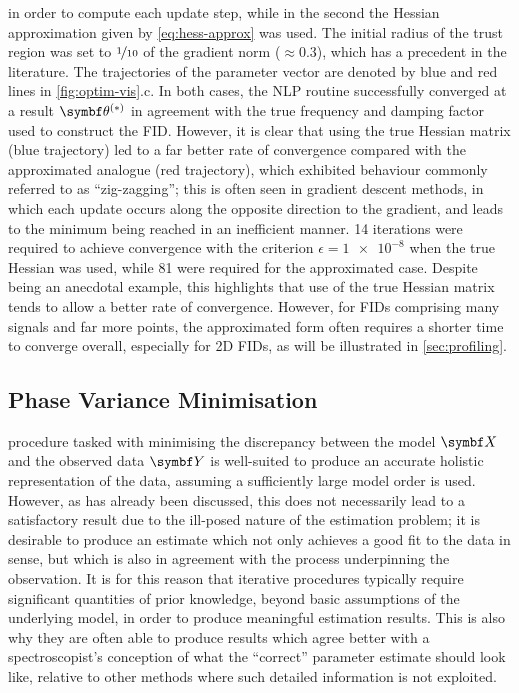 in order to compute each update step, while in the second the Hessian
approximation given by \cref{eq:hess-approx} was used. The initial
radius of the trust region was set to $\nicefrac{1}{10}$ of the gradient norm
($\approx 0.3$), which has a precedent in the literature\cite{Gould2005}. The
trajectories of the parameter vector are denoted by blue and red lines in
\cref{fig:optim-vis}.c.
In both cases, the \ac{NLP} routine successfully converged at a result $\bthstar$
in agreement with the true frequency and damping factor used to construct the
\ac{FID}. However, it is clear that using the true Hessian matrix (blue trajectory)
led to a far better rate of convergence compared with the
approximated analogue (red trajectory), which exhibited behaviour commonly
referred to as ``zig-zagging''; this is often seen in gradient
descent methods, in which each update occurs along the opposite direction to
the gradient, and leads to the minimum being reached in an inefficient manner.
14 iterations were required to achieve convergence with the
criterion $\epsilon = \num[print-unity-mantissa=false]{1e-8}$
when the true Hessian was used, while 81 were required for the approximated
case. Despite being an anecdotal example, this highlights that use of the true
Hessian matrix tends to allow a better rate of convergence. However, for
\acp{FID} comprising many signals and far more points, the approximated form
often requires a shorter time to converge overall, especially for \ac{2D}
\acp{FID}, as will be illustrated in \cref{sec:profiling}.

\subsection{Phase Variance Minimisation}
\label{subsec:phase-variance}
 procedure tasked with minimising the discrepancy between the model
$\bX$ and the observed data $\bY$ is well-suited to produce an accurate
holistic
representation of the data, assuming a sufficiently large
model order is used. However, as has already been discussed, this does not
necessarily lead to a satisfactory result due to the ill-posed nature of the
estimation problem;
it is desirable to produce an estimate which not only achieves a good fit to
the data in  sense, but which is also in agreement with the process
underpinning the observation. It is for this reason that iterative procedures
typically require significant quantities of prior knowledge, beyond basic
assumptions of the underlying model, in order to produce meaningful estimation
results.  This is also why they are often able to produce results which agree
better with a spectroscopist's conception of what the ``correct'' parameter
estimate should look like, relative to other methods where such detailed
information is not exploited.

